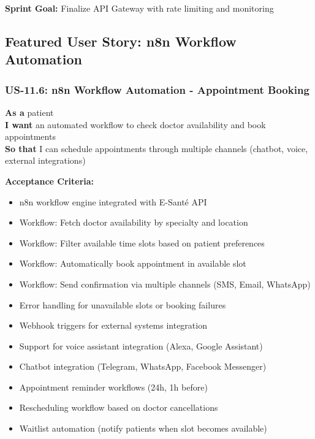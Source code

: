 \documentclass[11pt,a4paper]{article}
\begin{document}
\textbf{Sprint Goal:} Finalize API Gateway with rate limiting and monitoring

\subsection{Featured User Story: n8n Workflow Automation}

\subsubsection{US-11.6: n8n Workflow Automation - Appointment Booking}
\begin{tcolorbox}[colback=yellow!10,colframe=warningorange,title=\faLightbulb\ Innovation Feature]
\textbf{As a} patient\\
\textbf{I want} an automated workflow to check doctor availability and book appointments\\
\textbf{So that} I can schedule appointments through multiple channels (chatbot, voice, external integrations)
\end{tcolorbox}

\textbf{Acceptance Criteria:}
\begin{itemize}[label=\textcolor{successgreen}{\faCheck}]
    \item n8n workflow engine integrated with E-Santé API
    \item Workflow: Fetch doctor availability by specialty and location
    \item Workflow: Filter available time slots based on patient preferences
    \item Workflow: Automatically book appointment in available slot
    \item Workflow: Send confirmation via multiple channels (SMS, Email, WhatsApp)
    \item Error handling for unavailable slots or booking failures
    \item Webhook triggers for external systems integration
    \item Support for voice assistant integration (Alexa, Google Assistant)
    \item Chatbot integration (Telegram, WhatsApp, Facebook Messenger)
    \item Appointment reminder workflows (24h, 1h before)
    \item Rescheduling workflow based on doctor cancellations
    \item Waitlist automation (notify patients when slot becomes available)
\end{itemize}
\end{document}
